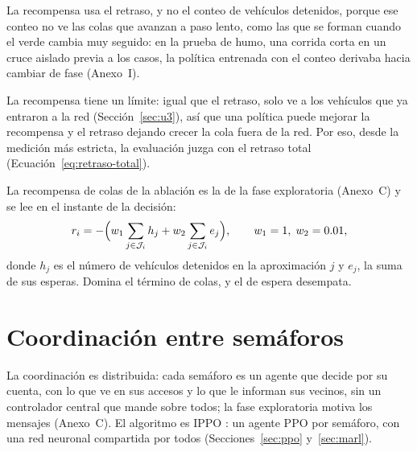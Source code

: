 La recompensa usa el retraso, y no el conteo de vehículos detenidos,
porque ese conteo no ve las colas que avanzan a paso lento, como las que
se forman cuando el verde cambia muy seguido: en la prueba de humo, una
corrida corta en un cruce aislado previa a los casos, la política
entrenada con el conteo derivaba hacia cambiar de fase (Anexo~I).

La recompensa tiene un límite: igual que el retraso, solo ve a los
vehículos que ya entraron a la red (Sección~\ref{sec:u3}), así que una
política puede mejorar la recompensa y el retraso dejando crecer la
cola fuera de la red. Por eso, desde la medición más estricta, la
evaluación juzga con el retraso total (Ecuación~\ref{eq:retraso-total}).

La recompensa de colas de la ablación es la de la fase exploratoria
(Anexo~C) y se lee en el instante de la decisión:
\begin{equation}
  r_i = -\Bigl(w_1 \sum_{j \in \mathcal{J}_i} h_j + w_2 \sum_{j \in \mathcal{J}_i} e_j\Bigr),
  \qquad w_1 = 1,\; w_2 = 0.01,
  \label{eq:recompensa}
\end{equation}
donde $h_j$ es el número de vehículos detenidos en la aproximación $j$
y $e_j$, la suma de sus esperas. Domina el término de colas, y el de
espera desempata.


\section{Coordinación entre semáforos}
\label{sec:u4}

La coordinación es distribuida: cada semáforo es un agente que decide
por su cuenta, con lo que ve en sus accesos y lo que le informan sus
vecinos, sin un controlador central que mande sobre todos; la fase
exploratoria motiva los mensajes (Anexo~C). El algoritmo es IPPO
\citep{Schulman2017_PPO,Yu2021_MAPPO}:
un agente PPO por semáforo, con una red neuronal compartida por todos
(Secciones~\ref{sec:ppo} y~\ref{sec:marl}).

